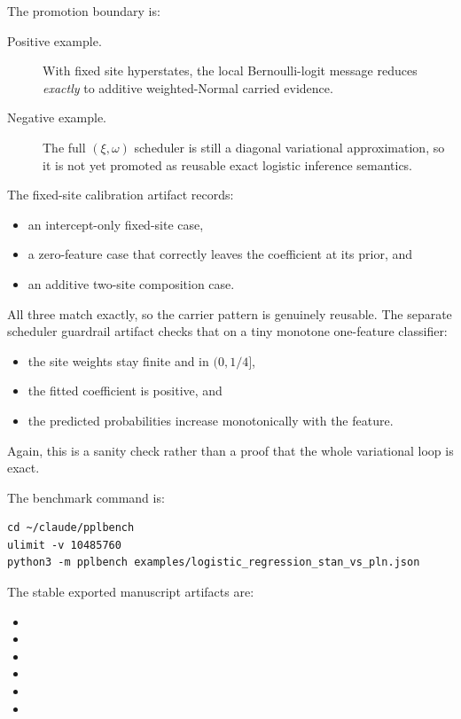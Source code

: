 \documentclass[11pt,openany]{report}
\begin{document}
The promotion boundary is:
\begin{description}
\item[Positive example.] With fixed site hyperstates, the local Bernoulli-logit
message reduces \emph{exactly} to additive weighted-Normal carried evidence.
\item[Negative example.] The full \((\xi, \omega)\) scheduler is still a
diagonal variational approximation, so it is not yet promoted as reusable exact
logistic inference semantics.
\end{description}

The fixed-site calibration artifact
records:
\begin{itemize}
\item an intercept-only fixed-site case,
\item a zero-feature case that correctly leaves the coefficient at its prior,
and
\item an additive two-site composition case.
\end{itemize}
All three match exactly, so the carrier pattern is genuinely reusable.  The
separate scheduler guardrail artifact
checks that on a tiny monotone one-feature classifier:
\begin{itemize}
\item the site weights stay finite and in \((0, 1/4]\),
\item the fitted coefficient is positive, and
\item the predicted probabilities increase monotonically with the feature.
\end{itemize}
Again, this is a sanity check rather than a proof that the whole variational
loop is exact.

The benchmark command is:
\begin{lstlisting}
cd ~/claude/pplbench
ulimit -v 10485760
python3 -m pplbench examples/logistic_regression_stan_vs_pln.json
\end{lstlisting}

The stable exported manuscript artifacts are:
\begin{itemize}
\item {}
\item {}
\item {}
\item {}
\item {}
\item {}
\end{itemize}
\end{document}
